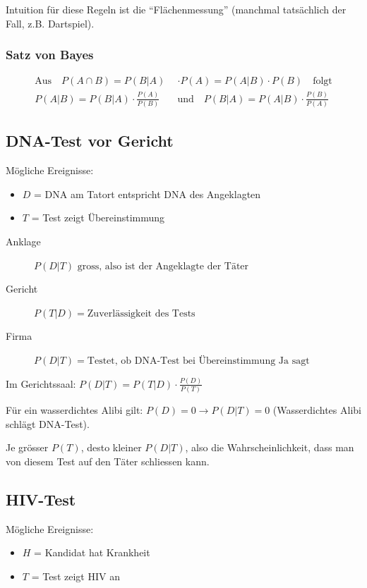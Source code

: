 \documentclass[10pt,a4paper]{scrartcl}
\newif\ifincludeExamples
\begin{document}
Intuition für diese Regeln ist die ``Flächenmessung'' (manchmal tatsächlich der Fall, z.B. Dartspiel).

\subsubsection{Satz von Bayes}
\begin{align*}
\text{Aus}\quad P(A \cap B) = P(B|A) & \cdot P(A) = P(A|B) \cdot P(B) \quad\text{folgt}\\
  P(A|B) = P(B|A) \cdot \frac{P(A)}{P(B)}\quad & \text{und} \quad P(B|A) = P(A|B) \cdot \frac{P(B)}{P(A)}
\end{align*}

\ifincludeExamples
\subsection{DNA-Test vor Gericht}
Mögliche Ereignisse:
\begin{itemize}
\item $D$ = DNA am Tatort entspricht DNA des Angeklagten
\item $T$ = Test zeigt Übereinstimmung
\end{itemize}

\begin{description} %
\item[Anklage] $P(D|T) \text{ gross, also ist der Angeklagte der Täter}$
\item[Gericht] $P(T|D) = \text{Zuverlässigkeit des Tests}$
\item[Firma] $P(D|T) = \text{Testet, ob DNA-Test bei Übereinstimmung Ja sagt}$
\end{description}

Im Gerichtssaal: $P(D|T) = P(T|D) \cdot \frac{P(D)}{P(T)}$

Für ein wasserdichtes Alibi gilt: $P(D) = 0 \rightarrow P(D|T) = 0$ (Wasserdichtes Alibi schlägt DNA-Test).

Je grösser $P(T)$, desto kleiner $P(D|T)$, also die Wahrscheinlichkeit, dass man von diesem Test auf den Täter schliessen kann.

\subsection{HIV-Test}
Mögliche Ereignisse:
\begin{itemize}
\item $H$ = Kandidat hat Krankheit
\item $T$ = Test zeigt HIV an
\end{itemize}
\end{document}
